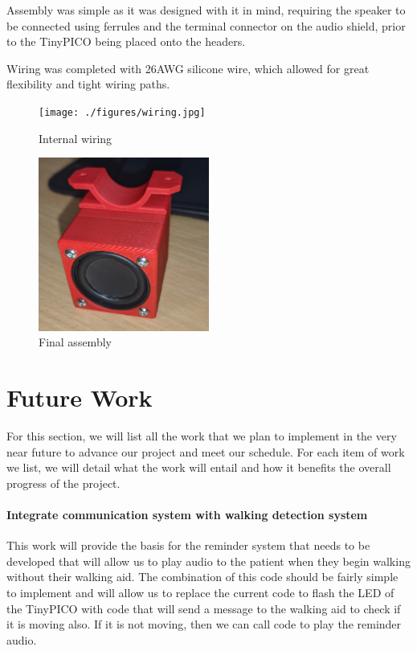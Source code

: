 {Assembly was simple as it was designed with it in mind, requiring the speaker to be connected using ferrules and the terminal connector on the audio shield, prior to the TinyPICO being placed onto the headers.

Wiring was completed with 26AWG silicone wire, which allowed for great flexibility and tight wiring paths.

    \begin{figure}[ht!]
        \centering %
            \texttt{[image: ./figures/wiring.jpg]}
            \caption{Internal wiring}
        \label{fig:wiring}
    \end{figure}
    
        \begin{figure}[ht!]
        \centering %
            \includegraphics[width=0.5\textwidth,keepaspectratio, angle=0]{./figures/final-assembly.png}
            \caption{Final assembly}
        \label{fig:assembly}
    \end{figure}

\section{Future Work}
\label{subsec:future_work}

For this section, we will list all the work that we plan to implement in the very near future to advance our project and meet our schedule. For each item of work we list, we will detail what the work will entail and how it benefits the overall progress of the project.

\paragraph{Integrate communication system with walking detection system}

This work will provide the basis for the reminder system that needs to be developed that will allow us to play audio to the patient when they begin walking without their walking aid. The combination of this code should be fairly simple to implement and will allow us to replace the current code to flash the LED of the TinyPICO with code that will send a message to the walking aid to check if it is moving also. If it is not moving, then we can call code to play the reminder audio.

}
